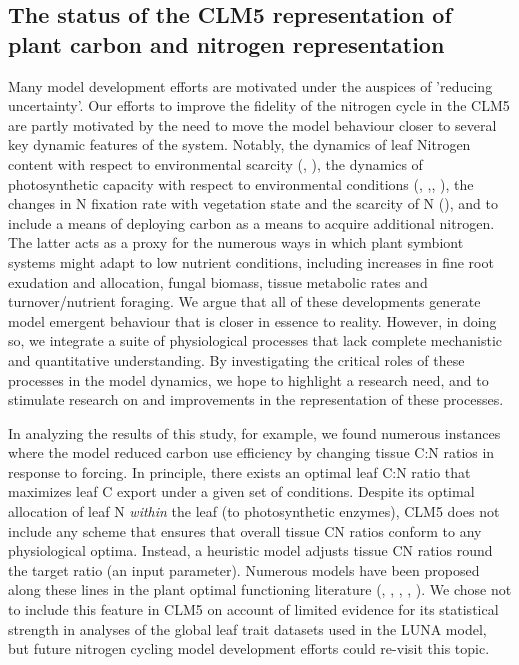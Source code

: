 \documentclass[draft,linenumbers]{agujournal}
\begin{document}
\subsection{The status of the CLM5 representation of plant carbon and nitrogen representation}
Many model development efforts are motivated under the auspices of 'reducing uncertainty'.  Our efforts to improve the fidelity of the nitrogen cycle in the CLM5 are partly motivated by the need to move the model behaviour closer to several key dynamic features of the system. Notably, the dynamics of leaf Nitrogen content with respect to environmental scarcity (\cite{zaehle2014}, \cite{brzostek2014}), the dynamics of photosynthetic capacity with respect to environmental conditions (\cite{xu2012}, \cite{ali2016},\cite{rogers2017}, \cite{bloomfield2018}), the changes in N fixation rate with vegetation state and the scarcity of N (\cite{vitousek2002}), and to include a means of deploying carbon as a means to acquire additional nitrogen. The latter acts as a proxy for the numerous ways in which plant symbiont systems might adapt to low nutrient conditions, including increases in fine root exudation and allocation, fungal biomass, tissue metabolic rates and turnover/nutrient foraging.  We argue that all of these developments generate model emergent behaviour that is closer in essence to reality. However, in doing so, we integrate a suite of physiological processes that lack complete mechanistic and quantitative understanding.  By investigating the critical roles of these processes in the model dynamics, we hope to highlight a research need, and to stimulate research on and improvements in the representation of these processes.

In analyzing the results of this study, for example, we found numerous instances where the model reduced carbon use efficiency by changing tissue C:N ratios in response to forcing. In principle, there exists an optimal leaf C:N ratio that maximizes leaf C export under a given set of conditions. Despite its optimal allocation of leaf N \emph{within} the leaf (to photosynthetic enzymes), CLM5 does not include any scheme that ensures that overall tissue CN ratios conform to any physiological optima. Instead, a heuristic model adjusts tissue CN ratios round the target ratio (an input parameter).  Numerous models have been proposed along these lines in the plant optimal functioning literature (\cite{vanwijk2003}, \cite{mcmurtrie2011}, \cite{a,nten2011} \cite{franklin2012}, \cite{mcmurtrie2013}, \cite{thomas2014}). We chose not to include this feature in CLM5 on account of limited evidence for its statistical strength in analyses of the global leaf trait datasets used in the LUNA model, but future nitrogen cycling model development efforts could re-visit this topic. 
\end{document}

